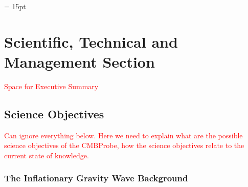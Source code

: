 \documentclass[12pt]{article}
\newcommand{\comred}[1]{\textcolor{red}{#1}}
\begin{document}


\setlength{\baselineskip}{0.96\baselineskip}
\setlength{\parskip}{1.\parskip}

\parindent = 15pt
\tableofcontents


\setcounter{figure}{0}

\newpage

\section{Scientific, Technical and Management Section}

\vspace{-0.13in}

\comred{Space for Executive Summary} 

\vspace{-0.22in}

\subsection{Science Objectives}
\label{sec:science}

\vspace{-0.05in}

\comred{Can ignore everything below. Here we need to explain what are the possible science objectives 
of the CMBProbe, how the science objectives relate to the current state of knowledge.}

\subsubsection{The Inflationary Gravity Wave Background}

\vspace{-0.05in}
\end{document}
